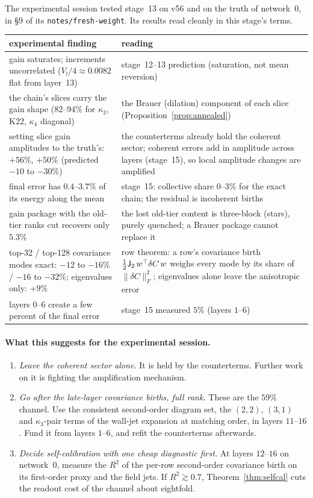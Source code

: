\label{sec:crossval}
The experimental session tested stage~13 on v56 and on the truth of network~0, in §9 of its
\texttt{notes/\allowbreak fresh-weight}. Its results read cleanly in
this stage's terms.
\begin{center}\small
\begin{tabular}{>{\raggedright\arraybackslash}p{6.2cm}>{\raggedright\arraybackslash}p{7.8cm}}\toprule
experimental finding & reading\\\midrule
gain saturates; increments uncorrelated ($V_l/4\approx0.0082$ flat from layer~13) & stage~12--13 prediction (saturation, not mean reversion)\\
the chain's slices carry the gain shape (82--94\% for $\kappa_3$, K22, $\kappa_4$ diagonal) & the Brauer (dilation) component of each slice (Proposition~\ref{prop:annealed})\\
setting slice gain amplitudes to the truth's: $+56\%$, $+50\%$ (predicted $-10$ to $-30\%$) & the counterterms already hold the coherent sector; coherent errors add in amplitude across layers (stage~15), so local amplitude changes are amplified\\
final error has $0.4$--$3.7\%$ of its energy along the mean & stage~15: collective share $0$--$3\%$ for the exact chain; the residual is incoherent births\\
gain package with the old-tier ranks cut recovers only $5.3\%$ & the lost old-tier content is three-block (stars), purely quenched; a Brauer package cannot replace it\\
top-32 / top-128 covariance modes exact: $-12$ to $-16\%$ / $-16$ to $-32\%$; eigenvalues only: $+9\%$ & row theorem: a row's covariance birth $\frac12\mathsf J_2\,w^\top\delta C\,w$ weighs every mode by its share of $\|\delta C\|_F^2$; eigenvalues alone leave the anisotropic error\\
layers 0--6 create a few percent of the final error & stage~15 measured $5\%$ (layers $1$--$6$)\\\bottomrule
\end{tabular}
\end{center}
\paragraph{What this suggests for the experimental session.}
\begin{enumerate}[leftmargin=*]
\item \emph{Leave the coherent sector alone.} It is held by the counterterms. Further work on it is fighting the amplification
mechanism.
\item \emph{Go after the late-layer covariance births, full rank.} These are the $59\%$ channel. Use the consistent second-order
diagram set, the $(2,2)$, $(3,1)$ and $\kappa_3$-pair terms of the wall-jet expansion at matching order, in layers $11$--$16$. Fund it from layers
$1$--$6$, and refit the counterterms afterwards.
\item \emph{Decide self-calibration with one cheap diagnostic first.} At layers $12$--$16$ on network~0, measure the $R^2$ of the per-row
second-order covariance birth on its first-order proxy and the field jets. If $R^2\gtrsim0.7$, Theorem~\ref{thm:selfcal} cuts the readout cost of the
channel about eightfold.
\end{enumerate}

